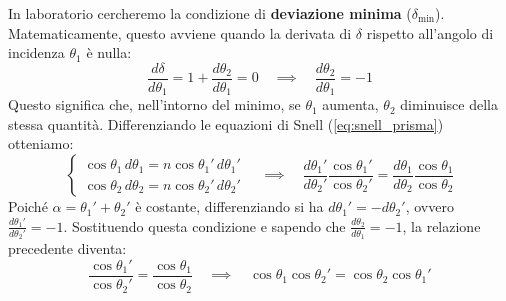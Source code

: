 \documentclass[openany,a4paper,12pt]{book}
\begin{document}
In laboratorio cercheremo la condizione di \textbf{deviazione minima} ($\delta_{\text{min}}$). Matematicamente, questo avviene quando la derivata di $\delta$ rispetto all'angolo di incidenza $\theta_1$ è nulla:
\begin{equation}
    \frac{d \delta}{d \theta_1}= 1 + \frac{d \theta_2}{d \theta_1}= 0 \quad \implies \quad \frac{d \theta_2}{d \theta_1} = -1
\end{equation}
Questo significa che, nell'intorno del minimo, se $\theta_1$ aumenta, $\theta_2$ diminuisce della stessa quantità. Differenziando le equazioni di Snell (\ref{eq:snell_prisma}) otteniamo:
\begin{equation}
    \begin{cases}
        \cos \theta_1 \, d\theta_1 = n \cos \theta_1' \, d\theta_1' \\
        \cos \theta_2 \, d\theta_2 = n \cos \theta_2' \, d\theta_2'
    \end{cases}
    \quad \implies \quad 
    \frac{d\theta_1'}{d\theta_2'} \frac{\cos \theta_1'}{\cos \theta_2'} = \frac{d\theta_1}{d\theta_2} \frac{\cos \theta_1}{\cos \theta_2}
\end{equation}
Poiché $\alpha = \theta_1' + \theta_2'$ è costante, differenziando si ha $d\theta_1' = - d\theta_2'$, ovvero $\frac{d\theta_1'}{d\theta_2'} = -1$. Sostituendo questa condizione e sapendo che $\frac{d \theta_2}{d \theta_1} = -1$, la relazione precedente diventa:
\begin{equation}
   \frac{\cos \theta_1'}{\cos \theta_2'} = \frac{\cos \theta_1}{\cos \theta_2} \quad \implies \quad \cos \theta_1 \cos \theta_2' = \cos \theta_2 \cos \theta_1'
\end{equation}
\end{document}
